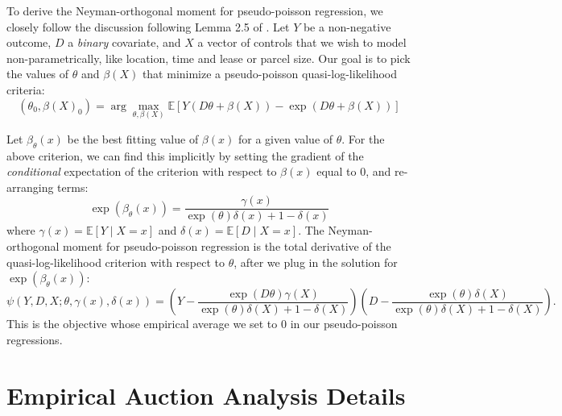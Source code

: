 \documentclass[12pt]{article}
\begin{document}
\begin{appendices}
To derive the Neyman-orthogonal moment for pseudo-poisson regression, we closely follow the discussion following Lemma 2.5 of \cite{chernozhukov2018double}.  Let $Y$ be a non-negative outcome, $D$ a \textit{binary} covariate, and $X$ a vector of controls that we wish to model non-parametrically, like location, time and lease or parcel size.  Our goal is to pick the values of $\theta$ and $\beta(X)$ that minimize a pseudo-poisson quasi-log-likelihood criteria:
\begin{equation*}
	(\theta_0, \beta(X)_0) = \arg \max_{\theta, \beta(X)} \mathbb{E}\left[Y(D\theta + \beta(X))-\exp(D\theta + \beta(X))\right]
\end{equation*}

Let $\beta_{\theta}(x)$ be the best fitting value of $\beta(x)$ for a given value of $\theta$.  For the above criterion, we can find this implicitly by setting the gradient of the \textit{conditional} expectation of the criterion with respect to $\beta(x)$ equal to 0, and re-arranging terms:
\begin{equation*}
	\exp(\beta_{\theta}(x)) = \frac{\gamma(x)}{\exp(\theta)\delta(x) + 1 - \delta(x)}
\end{equation*}	
where $\gamma(x) = \mathbb{E}\left[Y\mid X = x\right]$ and $\delta(x) = \mathbb{E}\left[D\mid X = x\right]$.  The Neyman-orthogonal moment for pseudo-poisson regression is the total derivative of the quasi-log-likelihood criterion with respect to $\theta$, after we plug in the solution for $\exp(\beta_{\theta}(x))$:
\begin{equation*}
	\psi(Y, D, X; \theta, \gamma(x), \delta(x)) = \left(Y-\frac{\exp(D\theta)\gamma(X)}{\exp(\theta)\delta(X) + 1 - \delta(X)}\right)\left(D - \frac{\exp(\theta)\delta(X)}{\exp(\theta)\delta(X) + 1 - \delta(X)}\right).
\end{equation*}
This is the objective whose empirical average we set to 0 in our pseudo-poisson regressions.

\section{Empirical Auction Analysis Details}\label{sec:AppendixAuction}


\end{appendices}
\end{document}
